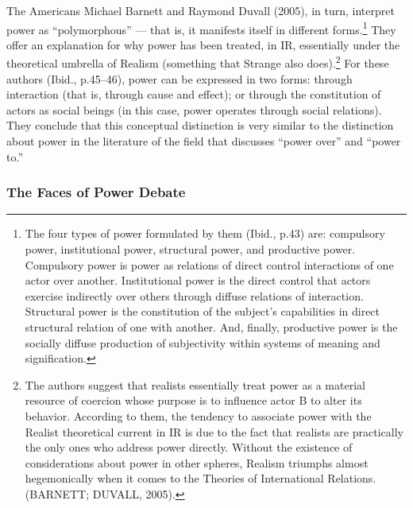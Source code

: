 The Americans Michael Barnett and Raymond Duvall (2005), in turn, interpret power as ``polymorphous'' --- that is, it manifests itself in different forms.\footnote{The four types of power formulated by them (Ibid., p.43) are: compulsory power, institutional power, structural power, and productive power. Compulsory power is power as relations of direct control interactions of one actor over another. Institutional power is the direct control that actors exercise indirectly over others through diffuse relations of interaction. Structural power is the constitution of the subject's capabilities in direct structural relation of one with another. And, finally, productive power is the socially diffuse production of subjectivity within systems of meaning and signification.} They offer an explanation for why power has been treated, in IR, essentially under the theoretical umbrella of Realism (something that Strange also does).\footnote{The authors suggest that realists essentially treat power as a material resource of coercion whose purpose is to influence actor B to alter its behavior. According to them, the tendency to associate power with the Realist theoretical current in IR is due to the fact that realists are practically the only ones who address power directly. Without the existence of considerations about power in other spheres, Realism triumphs almost hegemonically when it comes to the Theories of International Relations. (BARNETT; DUVALL, 2005).} For these authors (Ibid., p.45--46), power can be expressed in two forms: through interaction (that is, through cause and effect); or through the constitution of actors as social beings (in this case, power operates through social relations). They conclude that this conceptual distinction is very similar to the distinction about power in the literature of the field that discusses ``power over'' and ``power to.''

\subsubsection{The Faces of Power Debate}

